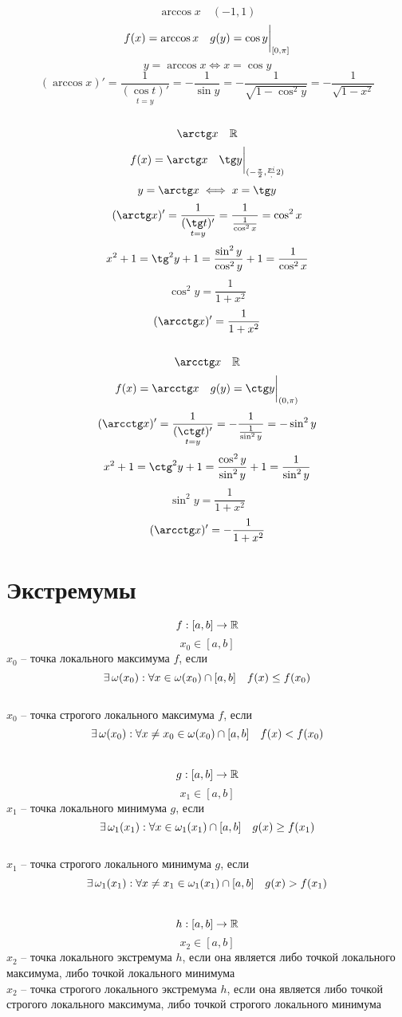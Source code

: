 \subsection{}
$$ \arccos x \quad (-1,1)$$
$$ f(x) = \arccos x \quad g(y) = \cos y \bigg|_{[0, \pi]}^{}$$
$$ y = \arccos x \iff x = \cos y$$
$$ (\arccos x)' = \underset{t = y}{\frac1{(\cos t)'}} = -\frac1{\sin y} = -\frac1{\sqrt{1-\cos^2 y}} = -\frac1{\sqrt{1 - x^2}}$$

\subsection{}
$$ \arctg x \quad \R$$
$$ f(x) = \arctg x \quad \tg y \clamp{(-\frac{\pi}2, \frac{pi},2)}$$
$$ y = \arctg x \iff x = \tg y$$
$$ (\arctg x)' = \underset{t = y}{\frac1{(\tg t)'}} = \frac1{\frac1{\cos^2 x}} = \cos^2 x$$
$$ x^2 + 1 = \tg^2 y + 1 = \frac{\sin^2 y}{\cos^2 y} + 1 = \frac1{\cos^2 x}$$
$$ \cos^2 y = \frac1{1 + x^2}$$
$$ (\arcctg x)' = \frac1{1 + x^2}$$

\subsection{}
$$ \arcctg x \quad \R$$
$$ f(x) = \arcctg x \quad g(y) = \ctg y \clamp{(0,\pi)}$$
$$ (\arcctg x)' = \underset{t = y}{\frac1{(\ctg t)'}} = -\frac1{\frac1{\sin^2 y}} = -\sin^2 y$$
$$ x^2 + 1 = \ctg^2 y + 1 = \frac{\cos^2 y}{\sin^2 y} + 1 = \frac1{\sin^2 y}$$
$$ \sin^2 y = \frac1{1 + x^2}$$
$$ (\arcctg x)' = -\frac1{1 + x^2}$$

\section{Экстремумы}

\begin{definition}
	$$ f : [a,b] \to \mathbb{R}$$
    $$ x_0 \in [a,b]$$
    $x_0$ -- точка локального максимума $f$, если
    $$ \exists\, \omega(x_0) : \forall x \in \omega(x_0) \cap [a,b] \quad f(x) \le f(x_0)$$
    \\
    $x_0$ -- точка строгого локального максимума $f$, если \\
    $$ \exists\, \omega(x_0) : \forall x \ne x_0 \in \omega(x_0) \cap [a,b] \quad f(x) < f(x_0)$$
    \\
    $$ g : [a,b] \to \mathbb{R}$$
    $$ x_1 \in [a,b]$$
    $x_1$ -- точка локального минимума $g$, если
    $$ \exists\, \omega_1(x_1) : \forall x \in \omega_1(x_1) \cap [a,b] \quad g(x) \ge f(x_1)$$
    \ \\
    $x_1$ -- точка строгого локального минимума $g$, если
    $$ \exists\, \omega_1(x_1) : \forall x \ne x_1 \in \omega_1(x_1) \cap [a,b] \quad g(x) > f(x_1)$$
    \ \\
    $$ h : [a,b] \to \mathbb{R}$$
    $$ x_2 \in [a,b]$$
    $x_2$ -- точка локального экстремума $h$, если она является либо точкой локального максимума, либо точкой локального минимума \\
    $x_2$ -- точка строгого локального экстремума $h$, если она является либо точкой строгого локального максимума, либо точкой строгого локального минимума
\end{definition}

